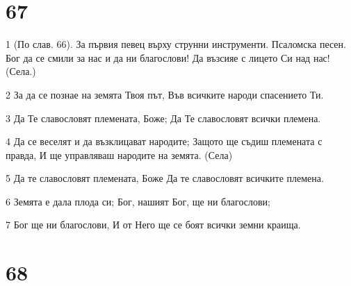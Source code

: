 \chapter{67}

\par 1 (По слав. 66). За първия певец върху струнни инструменти. Псаломска песен. Бог да се смили за нас и да ни благослови! Да възсияе с лицето Си над нас! (Села.)
\par 2 За да се познае на земята Твоя път, Във всичките народи спасението Ти.
\par 3 Да Те славословят племената, Боже; Да Те славословят всички племена.
\par 4 Да се веселят и да възклицават народите; Защото ще съдиш племената с правда, И ще управляваш народите на земята. (Села)
\par 5 Да те славословят племената, Боже Да те славословят всичките племена.
\par 6 Земята е дала плода си; Бог, нашият Бог, ще ни благослови;
\par 7 Бог ще ни благослови, И от Него ще се боят всички земни краища.

\chapter{68}

